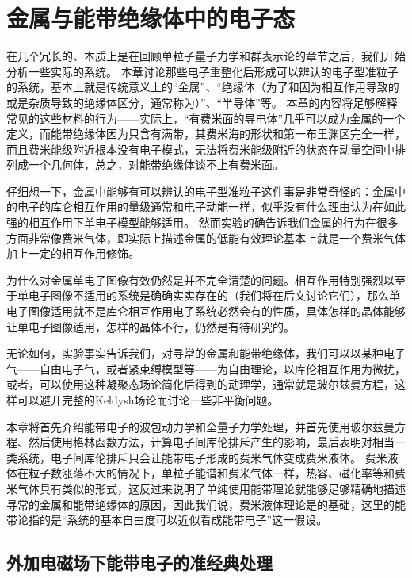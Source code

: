 \chapter{金属与能带绝缘体中的电子态}\label{chap:conventional-metal}

在几个冗长的、本质上是在回顾单粒子量子力学和群表示论的章节之后，我们开始分析一些实际的系统。
本章讨论那些电子重整化后形成可以辨认的电子型准粒子的系统，基本上就是传统意义上的“金属”、“绝缘体（为了和因为相互作用导致的或是杂质导致的绝缘体区分，通常称为）”、“半导体”等。
本章的内容将足够解释常见的这些材料的行为——实际上，“有费米面的导电体”几乎可以成为金属的一个定义，而能带绝缘体因为只含有满带，其费米海的形状和第一布里渊区完全一样，而且费米能级附近根本没有电子模式，无法将费米能级附近的状态在动量空间中排列成一个几何体，总之，对能带绝缘体谈不上有费米面。

仔细想一下，金属中能够有可以辨认的电子型准粒子这件事是非常奇怪的：金属中的电子的库仑相互作用的量级通常和电子动能一样，似乎没有什么理由认为在如此强的相互作用下单电子模型能够适用。
然而实验的确告诉我们金属的行为在很多方面非常像费米气体，即实际上描述金属的低能有效理论基本上就是一个费米气体加上一定的相互作用修饰。

为什么对金属单电子图像有效仍然是并不完全清楚的问题。相互作用特别强烈以至于单电子图像不适用的系统是确确实实存在的（我们将在后文讨论它们），那么单电子图像适用就不是库仑相互作用电子系统必然会有的性质，具体怎样的晶体能够让单电子图像适用，怎样的晶体不行，仍然是有待研究的。

无论如何，实验事实告诉我们，对寻常的金属和能带绝缘体，我们可以以某种电子气——自由电子气，或者紧束缚模型等——为自由理论，以库伦相互作用为微扰，或者，可以使用这种凝聚态场论简化后得到的动理学，通常就是玻尔兹曼方程，这样可以避开完整的Keldysh场论而讨论一些非平衡问题。

本章将首先介绍能带电子的波包动力学和全量子力学处理，并首先使用玻尔兹曼方程、然后使用格林函数方法，计算电子间库伦排斥产生的影响，最后表明对相当一类系统，电子间库伦排斥只会让能带电子形成的费米气体变成费米液体。
费米液体在粒子数涨落不大的情况下，单粒子能谱和费米气体一样，热容、磁化率等和费米气体具有类似的形式，这反过来说明了单纯使用能带理论就能够足够精确地描述寻常的金属和能带绝缘体的原因，因此我们说，费米液体理论是的基础，这里的能带论指的是“系统的基本自由度可以近似看成能带电子”这一假设。

\section{外加电磁场下能带电子的准经典处理}

